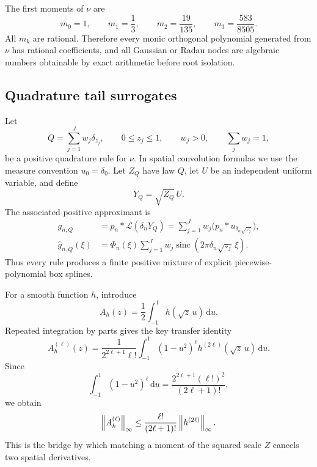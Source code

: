 \documentclass[11pt,oneside]{article}
\numberwithin{equation}{section}
\theoremstyle{definition}
\theoremstyle{remark}
\newcommand{\sinc}{\operatorname{sinc}}
\newcommand{\dd}{\,\mathrm d}
\begin{document}
The first moments of $\nu$ are
\begin{equation}
 m_0=1,
 \qquad m_1=\frac13,
 \qquad m_2=\frac{19}{135},
 \qquad m_3=\frac{583}{8505}.
 \label{p3:eq:nu-first-moments}
\end{equation}
All $m_k$ are rational.  Therefore every monic orthogonal polynomial generated from
$\nu$ has rational coefficients, and all Gaussian or Radau nodes are algebraic numbers
obtainable by exact arithmetic before root isolation.

\subsection{Quadrature tail surrogates}

Let
\begin{equation}
 Q=\sum_{j=1}^{J}w_j\delta_{z_j},
 \qquad
 0\le z_j\le1,
 \qquad w_j>0,
 \qquad \sum_jw_j=1,
 \label{p3:eq:quadrature-Q}
\end{equation}
be a positive quadrature rule for $\nu$.  In spatial convolution formulas we use the
measure convention $u_0=\delta_0$.  Let $Z_Q$ have law $Q$, let $U$ be an
independent uniform variable, and define
\begin{equation}
 Y_Q=\sqrt{Z_Q}\,U.
 \label{p3:eq:YQ}
\end{equation}
The associated positive approximant is
\begin{align}
 g_{n,Q}
 &=p_n*\mathcal L(\delta_nY_Q)
 =\sum_{j=1}^{J}w_j\bigl(p_n*u_{\delta_n\sqrt{z_j}}\bigr),
 \label{p3:eq:gQ-spatial}\\
 \widehat g_{n,Q}(\xi)
 &=\Phi_n(\xi)\sum_{j=1}^{J}w_j
 \sinc(2\pi\delta_n\sqrt{z_j}\,\xi).
 \label{p3:eq:gQ-fourier}
\end{align}
Thus every rule produces a finite positive mixture of explicit piecewise-polynomial
box splines.

For a smooth function $h$, introduce
\begin{equation}
 A_h(z)=\frac12\int_{-1}^{1}h(\sqrt z\,u)\dd u.
 \label{p3:eq:Ah}
\end{equation}
Repeated integration by parts gives the key transfer identity
\begin{equation}
 A_h^{(\ell)}(z)
 =\frac{1}{2^{2\ell+1}\ell!}
 \int_{-1}^{1}(1-u^2)^\ell h^{(2\ell)}(\sqrt z\,u)\dd u.
 \label{p3:eq:Ah-derivative}
\end{equation}
Since
\begin{equation}
 \int_{-1}^{1}(1-u^2)^\ell\dd u
 =\frac{2^{2\ell+1}(\ell!)^2}{(2\ell+1)!},
 \label{p3:eq:beta-integral}
\end{equation}
we obtain
\begin{equation}
 \left\lVert A_h^{(\ell)}\right\rVert_\infty
 \le\frac{\ell!}{(2\ell+1)!}\left\lVert h^{(2\ell)}\right\rVert_\infty.
 \label{p3:eq:Ah-bound}
\end{equation}
This is the bridge by which matching a moment of the squared scale $Z$ cancels two
spatial derivatives.
\end{document}
